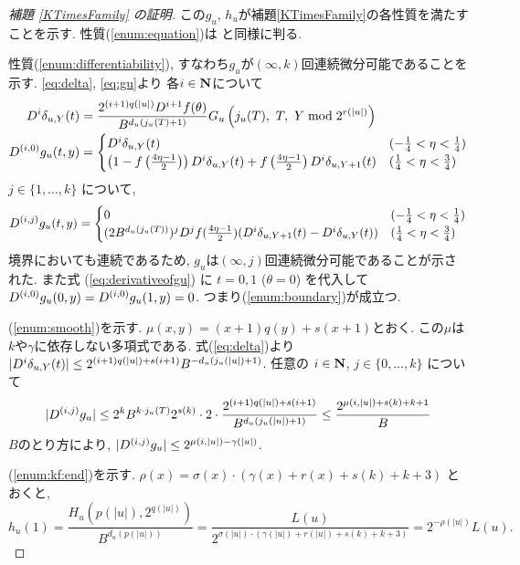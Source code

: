 \begin{proof}[\rm 補題 \ref{KTimesFamily} の証明]
この$g_u$, $h_u$が補題\ref{KTimesFamily}の各性質を満たすことを示す. 
性質(\ref{enum:equation})は
\cite[補題 4.1]{kawamura2010lipschitz}と同様に判る.

性質(\ref{enum:differentiability}), すなわち$g _u$が$(\infty, k)$回連続微分可能であることを示す.
  \eqref{eq:delta}, \eqref{eq:gu}より
  各$i \in \mathbf N$について
  \begin{align}
   D^i \delta_{u,Y}(t) 
&
    = \frac{2^{(i+1)q(|u|)} D^{i+1}f(\theta)}{B^{d_u(j_u(T)+1)}}
    G_u\left( j_u(T),\ T,\ Y \bmod 2^{r(|u|)} \right)
\\
   \label{eq:derivativeofgu}
    D^{(i,0)} g_u(t, y)
&
     = \begin{cases}
 	D^i \delta_{u, Y}(t) 
	& (- \frac 1 4 < \eta < \frac 1 4) \\
	\left( 1-f \left(\frac{4\eta-1}{2}\right)\right) 
	D^i \delta_{u, Y}(t)
	+ f \left(\frac{4\eta-1}{2}\right) D^i \delta_{u,Y+1}(t) 
	& (\frac 1 4 < \eta < \frac 3 4)
       \end{cases}
  \end{align}
  $j \in \{1, \dots , k\}$ について,
  \begin{equation}
    D^{(i,j)} g_u(t, y)
     = \begin{cases}
	0 & (- \frac 1 4 < \eta < \frac 1 4) \\
	(2B^{d_u(j_u(T))})^j D^j f(\frac{4\eta - 1}2)
	(D^i \delta_{u,Y+1}(t)-D^i \delta_{u, Y}(t)) 
	& (\frac 1 4 < \eta < \frac 3 4)
       \end{cases}
  \end{equation}
  境界においても連続であるため,
  $g _u$は$(\infty, j)$回連続微分可能であることが示された.
また式 (\ref{eq:derivativeofgu}) に $t = 0, 1$ ($\theta = 0$) を代入して
  $D^{(i, 0)} g_u(0,y) = D^{(i, 0)} g_u(1,y) = 0$.
  つまり(\ref{enum:boundary})が成立つ.

  (\ref{enum:smooth})を示す.
  $\mu(x, y) = (x+1)q(y) + s(x+1)$とおく.
  この$\mu$は$k$や$\gamma$に依存しない多項式である.
  式(\ref{eq:delta})より
  $|D^i \delta_{u,Y}(t)| \le 2^{(i+1)q(|u|) + s(i+1)}B^{-d_u(j_u(|u|)+1)}$.
  任意の $i \in \mathbf N$, $j \in \{0, \dots, k\}$ について
  \begin{equation}
   |D^{(i,j)} g_u| 
   \le 
   2^k B^{k \cdot j_u(T)} 2^{s(k)} \cdot 2 \cdot 
   \frac{2^{(i+1)q(|u|) + s(i+1)}}{B^{d_u(j_u(|u|)+1)}} 
   \le
   \frac{2^{\mu(i, |u|) + s(k) + k + 1}}{B}
  \end{equation}
  $B$のとり方により, $|D^{(i,j)} g_u| \leq 2^{\mu(i, |u|) - \gamma(|u|)}$.

  (\ref{enum:kf:end})を示す.
  $\rho(x) = \sigma(x) \cdot (\gamma(x)+r(x)+s(k)+k+3)$ とおくと,
  \begin{equation}
   h_u(1) = \frac{H_u(p(|u|), 2^{q(|u|)})}{B^{d_u(p(|u|))}} 
          = \frac{L(u)}{2^{\sigma(|u|) \cdot (\gamma(|u|)+r(|u|)+s(k)+k+3)}}
	  = 2^{-\rho(|u|)} L(u).
  \end{equation}
 \end{proof}



